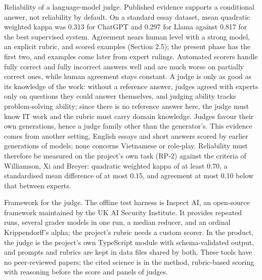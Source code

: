 Reliability of a language-model judge. Published evidence supports a conditional answer, not reliability by default. On a standard essay dataset, mean quadratic weighted kappa was 0.313 for ChatGPT and 0.297 for Llama against 0.817 for the best supervised system\cite{r127}. Agreement nears human level with a strong model, an explicit rubric, and scored examples (Section 2.5)\cite{r101,r102,r103,r104,r105}; the present phase has the first two, and examples come later from expert rulings. Automated scorers handle fully correct and fully incorrect answers well and are much worse on partially correct ones, while human agreement stays constant\cite{r128}. A judge is only as good as its knowledge of the work: without a reference answer, judges agreed with experts only on questions they could answer themselves\cite{r129}, and judging ability tracks problem-solving ability\cite{r60}; since there is no reference answer here, the judge must know IT work and the rubric must carry domain knowledge. Judges favour their own generations\cite{r130}, hence a judge family other than the generator's. This evidence comes from another setting, English essays and short answers scored by earlier generations of models; none concerns Vietnamese or role-play. Reliability must therefore be measured on the project's own task (RP-2) against the criteria of Williamson, Xi and Breyer\cite{r71}: quadratic weighted kappa of at least 0.70, a standardised mean difference of at most 0.15, and agreement at most 0.10 below that between experts.

Framework for the judge. The offline test harness is Inspect AI, an open-source framework maintained by the UK AI Security Institute\cite{r131}. It provides repeated runs, several grader models in one run, a median reducer, and an ordinal Krippendorff's alpha; the project's rubric needs a custom scorer. In the product, the judge is the project's own TypeScript module with schema-validated output, and prompts and rubrics are kept in data files shared by both. These tools have no peer-reviewed papers; the cited science is in the method, rubric-based scoring with reasoning before the score\cite{r58} and panels of judges\cite{r74}.

